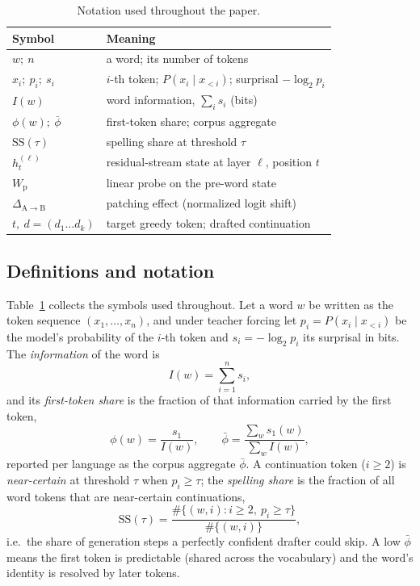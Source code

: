 \begin{table}[t]
\caption{Notation used throughout the paper.}
\label{tab:notation}
\centering\small
\begin{tabular}{@{}ll@{}}
\toprule
Symbol & Meaning \\
\midrule
$w;\ n$ & a word; its number of tokens \\
$x_i;\ p_i;\ s_i$ & $i$-th token; $P(x_i\mid x_{<i})$; surprisal $-\log_2 p_i$ \\
$I(w)$ & word information, $\sum_i s_i$ (bits) \\
$\phi(w);\ \bar\phi$ & first-token share; corpus aggregate \\
$\mathrm{SS}(\tau)$ & spelling share at threshold $\tau$ \\
$h^{(\ell)}_t$ & residual-stream state at layer $\ell$, position $t$ \\
$W_{\mathrm{p}}$ & linear probe on the pre-word state \\
$\Delta_{\mathrm{A}\to\mathrm{B}}$ & patching effect (normalized logit shift) \\
$t,\ d=(d_1\dots d_k)$ & target greedy token; drafted continuation \\
\bottomrule
\end{tabular}
\end{table}

\subsection{Definitions and notation}
\label{sec:defs}
Table~\ref{tab:notation} collects the symbols used throughout. Let a word $w$ be
written as the token sequence $(x_1,\dots,x_n)$, and under teacher forcing let
$p_i = P(x_i \mid x_{<i})$ be the model's probability of the $i$-th token and
$s_i = -\log_2 p_i$ its surprisal in bits. The \emph{information} of the word is
\begin{equation}
I(w) = \sum_{i=1}^{n} s_i ,
\end{equation}
and its \emph{first-token share} is the fraction of that information carried by
the first token,
\begin{equation}
\phi(w) = \frac{s_1}{I(w)} ,\qquad
\bar\phi = \frac{\sum_w s_1(w)}{\sum_w I(w)} ,
\end{equation}
reported per language as the corpus aggregate $\bar\phi$. A continuation token
($i \ge 2$) is \emph{near-certain} at threshold $\tau$ when $p_i \ge \tau$; the
\emph{spelling share} is the fraction of all word tokens that are near-certain
continuations,
\begin{equation}
\mathrm{SS}(\tau) = \frac{\#\{(w,i): i\ge 2,\ p_i \ge \tau\}}{\#\{(w,i)\}} ,
\end{equation}
i.e.\ the share of generation steps a perfectly confident drafter could skip. A
low $\bar\phi$ means the first token is predictable (shared across the
vocabulary) and the word's identity is resolved by later tokens.

